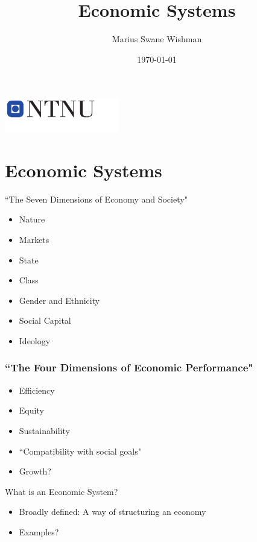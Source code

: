 \documentclass{beamer}
\title[Economic Systems]{Economic Systems}
\subtitle{}
\author[Wishman]{Marius Swane Wishman}
\date{\today}
\institute{ISS}
\begin{document}
\begin{frame}[plain]
\titlepage 
\centering
\includegraphics[width=5cm]{logo_ntnu_u-slagord.pdf} 
\end{frame}

\section{Economic Systems} 

\begin{frame}{``The Seven Dimensions of Economy and Society"}
    \begin{itemize}[<+- | alert@+>]
        \item Nature
        \item Markets
        \item State
        \item Class
        \item Gender and Ethnicity
        \item Social Capital
        \item Ideology
    \end{itemize}{}
\end{frame}{}

\begin{frame}
\frametitle{``The Four Dimensions of Economic Performance"}

\begin{itemize}[<+- | alert@+>]
	\item Efficiency
	\item Equity
	\item Sustainability
	\item ``Compatibility with social goals"
	\item Growth?
\end{itemize}

\end{frame}
\begin{frame}{What is an Economic System?}
    \begin{itemize}[<+- | alert@+>]
        \item Broadly defined: A way of structuring an economy 
        \item Examples?
    \end{itemize}{}
\end{frame}{}
\end{document}
